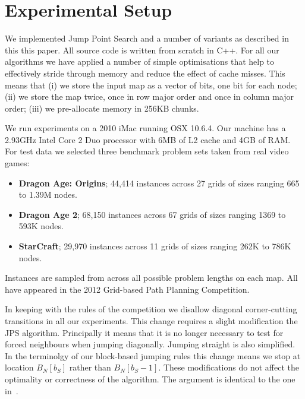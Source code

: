 

\section{Experimental Setup}
\label{sec::setup}
We implemented Jump Point Search and a number of variants as described
in this this paper. All source code is written from scratch in C++.
For all our algorithms we have applied a number of simple optimisations 
that help to effectively stride through memory and reduce the effect of 
cache misses.
This means that (i) we store the input map as a vector of bits, one bit 
for each node; (ii) we store the map twice, once in row major order and 
once in column major order; (iii) we pre-allocate memory in 256KB chunks.

We run experiments on a 2010 iMac running OSX 10.6.4. Our machine has 
a 2.93GHz Intel Core 2 Duo processor with 6MB of L2 cache and 4GB of RAM.
For test data we selected three benchmark problem sets taken from
real video games: 
\begin{itemize}
\item \textbf{Dragon Age: Origins}; 44,414 instances across 27 grids of 
sizes ranging 665 to 1.39M nodes.
\item \textbf{Dragon Age 2}; 68,150 instances across 67 grids of sizes 
ranging 1369 to 593K nodes.
\item \textbf{StarCraft}; 29,970 instances across 11 grids of sizes 
ranging 262K to 786K nodes.
\end{itemize}
Instances are sampled from across all possible problem lengths on each map.
All have appeared in the 2012 Grid-based Path Planning Competition. 

In keeping with the rules of the competition we disallow diagonal
corner-cutting transitions in all our experiments.  This change requires a
slight modification the JPS algorithm.  Principally it means that it is no
longer necessary to test for forced neighbours when jumping diagonally.
Jumping straight is also simplified. In the terminolgy of our block-based
jumping rules this change means we stop at location $B_N[b_S]$ rather than
$B_N[b_S-1]$.  These modifications do not affect the optimality or 
correctness of the algorithm. The argument is identical to the one
in~\cite{harabor11b}.
